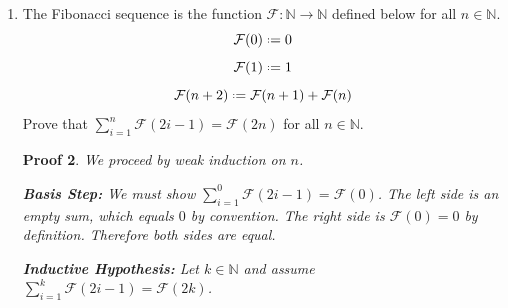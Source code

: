 \documentclass[12pt]{article}
\newcommand{\defeq}{\mathrel{\vcenter{\baselineskip0.5ex \lineskiplimit0pt
                     \hbox{\scriptsize.}\hbox{\scriptsize.}}}=}
\newcommand{\N}{\mathbb{N}}
\theoremstyle{proofstyle}
\newtheorem*{proof*}{Proof}
\begin{document}
\begin{enumerate}[left=0pt, itemsep=2em, parsep=1em]
\begin{proof*}
We will prove by weak induction on $n$.

\textbf{Basis Step:} We must show $2^4 < 4!$. We first expand $4!$ using the recursive definition.
\begin{align*}
  4! &= ((((1) \cdot 1) \cdot 2) \cdot 3) \cdot 4 &&\text{by definition of }! \\
     &= 24 &&\text{by arithmetic}
\end{align*}
Since $2^4 = 16 < 24 = 4!$, the basis step holds.

\textbf{Inductive Hypothesis:} Let $k \in \N$ with $k \geq 4$, and assume $2^k < k!$.

\textbf{Inductive Step:} We must show $2^{k+1} < (k+1)!$. Observe:
\begin{align*}
  2^{k+1} &= 2^k \cdot 2 &&\text{by definition of exponentiation} \\
          &< k! \cdot 2 &&\text{by the inductive hypothesis} \\
          &< k! \cdot (k+1) &&\text{since }k \geq 4 \text{ implies } k + 1 > 2\\
          &= (k+1)! &&\text{by definition of }!
\end{align*}
Therefore $2^{k+1} < (k+1)!$.

By induction, $(\forall n \in \N)(n \geq 4 \Rightarrow 2^n < n!)$.
\end{proof*}

\newpage

\item The Fibonacci sequence is the function $\mathcal{F} : \N \to \N$ defined below for all $n \in \N$.
\[
  \mathcal{F}(0) \defeq 0
\]
\[
  \mathcal{F}(1) \defeq 1
\]
\[
  \mathcal{F}(n+2) \defeq \mathcal{F}(n+1) + \mathcal{F}(n)
\]
Prove that $\displaystyle\sum_{i=1}^{n} \mathcal{F}(2i-1) = \mathcal{F}(2n)$ for all $n \in \N$.

\begin{proof*}
We proceed by weak induction on $n$.

\textbf{Basis Step:} We must show $\displaystyle\sum_{i=1}^{0} \mathcal{F}(2i-1) = \mathcal{F}(0)$. The left side is an empty sum, which equals $0$ by convention. The right side is $\mathcal{F}(0) = 0$ by definition. Therefore both sides are equal.

\textbf{Inductive Hypothesis:} Let $k \in \N$ and assume $\displaystyle\sum_{i=1}^{k} \mathcal{F}(2i-1) = \mathcal{F}(2k)$.


\end{proof*}
\end{enumerate}
\end{document}
